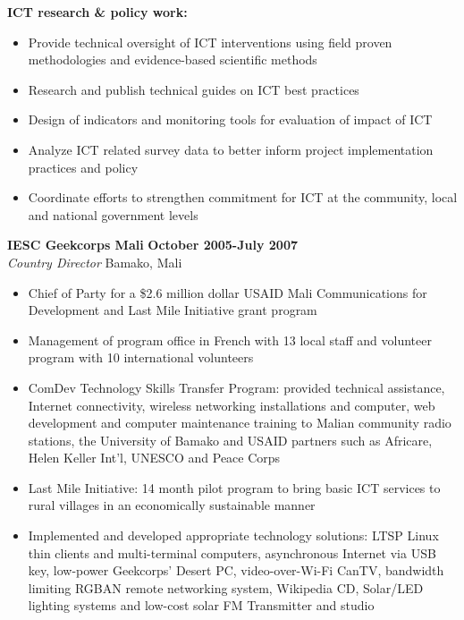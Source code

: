 \documentclass{res}
\begin{document}
\begin{resume}
\textbf{ICT research \& policy work:}
\begin{itemize} \itemsep -2pt %
	\item Provide technical oversight of ICT interventions using field proven methodologies and evidence-based scientific methods
	\item Research and publish technical guides on ICT best practices
	\item Design of indicators and monitoring tools for evaluation of impact of ICT
	\item Analyze ICT related survey data to better inform project implementation practices and policy 
	\item Coordinate efforts to strengthen commitment for ICT at the community, local and national 
	government levels  
 \end{itemize} \vspace{-4pt}

\textbf{IESC Geekcorps Mali} \hfill        \textbf{October 2005-July 2007} \\
\emph{Country Director}       \hfill   Bamako, Mali
   \begin{itemize} \itemsep -2pt %
	\item Chief of Party for a \$2.6 million dollar USAID Mali Communications for Development and Last Mile Initiative grant program 
	\item Management of program office in French with 13 local staff and volunteer program with 10 international volunteers 
	\item ComDev Technology Skills Transfer Program: provided technical assistance, Internet connectivity, wireless networking 
installations and computer, web development and computer maintenance training to Malian community radio stations, the 
University of Bamako and USAID partners such as Africare, Helen Keller Int’l, UNESCO and Peace Corps 
	\item Last Mile Initiative: 14 month pilot program to bring basic ICT services to rural villages in an economically sustainable manner 
	\item Implemented and developed appropriate technology solutions: LTSP Linux thin clients and multi-terminal computers, 
asynchronous Internet via USB key, low-power Geekcorps’ Desert PC, video-over-Wi-Fi CanTV, bandwidth limiting RGBAN 
remote networking system, Wikipedia CD, Solar/LED lighting systems and low-cost solar FM Transmitter and studio
 \end{itemize} \vspace{-4pt}


\end{resume}
\end{document}
